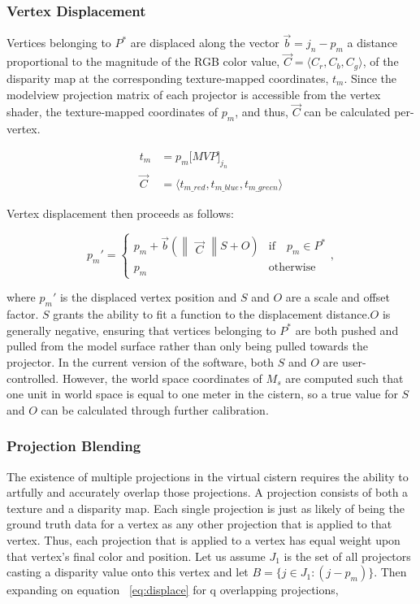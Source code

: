\documentclass[a4paper,twoside]{article}
\begin{document}
\subsubsection{Vertex Displacement}

Vertices belonging to $P^{*}$ are displaced along the vector $\vec{b} = j_{n} - p_{m}$ a distance proportional to the magnitude of the RGB color value, $\vec{C} = \langle C_{r}, C_{b}, C_{g} \rangle$, of the disparity map at the corresponding texture-mapped coordinates, $t_m$. Since the modelview projection matrix of each projector is accessible from the vertex shader, the texture-mapped coordinates of $p_m$, and thus, $\vec{C}$ can be calculated per-vertex.

\begin{align}
t_{m} &= p_{m}\lbrack MVP \rbrack _{j_{n}} \\
\vec{C} &= \langle t_{m\_red}, t_{m\_blue}, t_{m\_green} \rangle
\end{align}

Vertex displacement then proceeds as follows:

\begin{equation}
p_{m}' = \left \{ 
\begin{array}{ll}
p_{m} + \vec{b} (\begin{Vmatrix}\vec{C}\end{Vmatrix} S + O) & \text{if} \quad p_{m} \in P^{*}\\
p_{m} & \text{otherwise}
\end{array},\right.
\label{eq:displace}
\end{equation}

where $p_{m}'$ is the displaced vertex position and $S$ and $O$ are a scale and offset factor. $S$ grants the ability to fit a function to the displacement distance.$O$ is generally negative, ensuring that vertices belonging to $P^{*}$ are both pushed and pulled from the model surface rather than only being pulled towards the projector. In the current version of the software, both $S$ and $O$ are user-controlled. However, the world space coordinates of $M_s$ are computed such that one unit in world space is equal to one meter in the cistern, so a true value for $S$ and $O$ can be calculated through further calibration.
 
 \subsubsection{Projection Blending}

The existence of multiple projections in the virtual cistern requires the ability to artfully and accurately overlap those projections.
A projection consists of both a texture and a disparity map.
Each single projection is just as likely of being the ground truth data for a vertex as any other projection that is applied to that vertex. 
Thus, each projection that is applied to a vertex has equal weight upon that vertex's final color and position.
Let us assume $J_1$ is the set of all projectors casting a disparity value onto this vertex and let $B = \{j \in J_1 : (j - p_m)\}$. 
Then expanding on equation ~\ref{eq:displace} for q overlapping projections,
\end{document}
